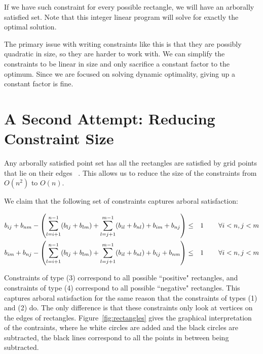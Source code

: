 \documentclass[11pt]{article}
\begin{document}
If we have such constraint for every possible rectangle, we will have an arborally satisfied set. Note that this integer linear program will solve for exactly the optimal solution.

The primary issue with writing constraints like this is that they are possibly quadratic in size, so they are harder to work with. We can simplify the constraints to be linear in size and only sacrifice a constant factor to the optimum. Since we are focused on solving dynamic optimality, giving up a constant factor is fine.

\section{A Second Attempt: Reducing Constraint Size}

Any arborally satisfied point set has all the rectangles are satisfied by grid points that lie on their edges ~\cite{geometryBST}. This allows us to reduce the size of the constraints from $O(n^2)$ to $O(n)$.

We claim that the following set of constraints captures arboral satisfaction: 

\begin{align}
b_{ij} + b_{nm} - \left(\sum_{l=i+1}^{n-1} (b_{lj}+b_{lm}) + \sum_{l=j+1}^{m-1} (b_{il} + b_{nl}) + b_{im} + b_{nj} \right) &\leq& 1 & \hspace{.3in} \forall i<n, j<m \\
b_{im} + b_{nj} - \left(\sum_{l=i+1}^{n-1} (b_{lj}+b_{lm}) + \sum_{l=j+1}^{m-1} (b_{il} + b_{nl}) + b_{ij} + b_{nm} \right) &\leq& 1 & \hspace{.3in} \forall i<n, j<m
\end{align}

Constraints of type (3) correspond to all possible ``positive" rectangles, and constraints of type (4) correspond to all possible ``negative" rectangles. This captures arboral satisfaction for the same reason that the constraints of types (1) and (2) do. The only difference is that these constraints only look at vertices on the edges of rectangles. Figure~\ref{fig:rectangles} gives the graphical interpretation of the contraints, where he white circles are added  and the black circles are subtracted, the black lines correspond to all the points in between being subtracted.
\end{document}
